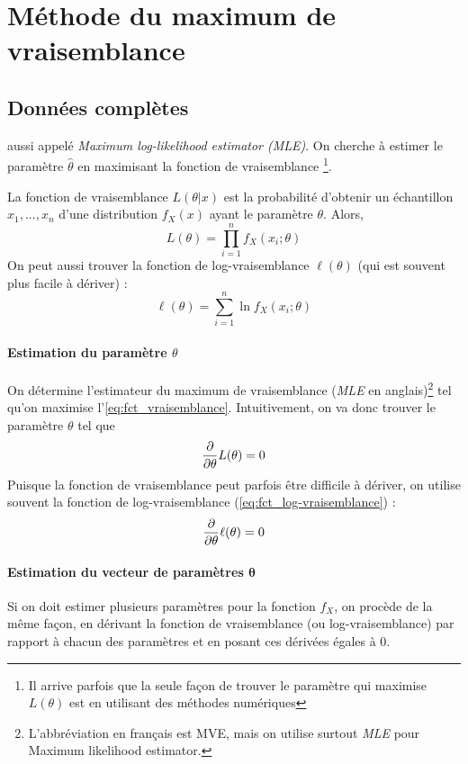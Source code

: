 \documentclass[12pt, french]{report}
\begin{document}
\section{Méthode du maximum de vraisemblance}
\subsection{Données complètes}
aussi appelé \emph{Maximum log-likelihood estimator (MLE)}. On cherche à estimer le paramètre $\hat{\theta}$ en maximisant la fonction de vraisemblance \footnote{Il arrive parfois que la seule façon de trouver le paramètre qui maximise $L(\theta)$ est en utilisant des méthodes numériques}.

\begin{definition}
La fonction de vraisemblance $L(\theta  | x)$ est la probabilité d'obtenir un échantillon $x_1, ..., x_n$ d'une distribution $f_X(x)$ ayant le paramètre $\theta$. Alors,
\begin{equation}
\label{eq:fct_vraisemblance}
L(\theta)	= \prod_{i=1}^{n} f_X(x_i ; \theta)
\end{equation}
On peut aussi trouver la fonction de log-vraisemblance $\ell(\theta)$ (qui est souvent plus facile à dériver) : 
\begin{equation}
\label{eq:fct_log-vraisemblance}
\ell(\theta) = \sum_{i=1}^{n} \ln f_X(x_i ; \theta)
\end{equation}
\end{definition}
\paragraph{Estimation du paramètre $\theta$} On détermine l'estimateur du maximum de vraisemblance (\emph{MLE} en anglais)\footnote{L'abbréviation en français est MVE, mais on utilise surtout \emph{MLE} pour Maximum likelihood estimator.} tel qu'on maximise l'\autoref{eq:fct_vraisemblance}. Intuitivement, on va donc trouver le paramètre $\theta$ tel que
\[\frac{\partial}{\partial \theta} L(\theta) = 0\]
Puisque la fonction de vraisemblance peut parfois être difficile à dériver, on utilise souvent la fonction de log-vraisemblance (\autoref{eq:fct_log-vraisemblance}) : 
\[\frac{\partial}{\partial \theta} \ell(\theta) = 0\]
\paragraph{Estimation du vecteur de paramètres $\boldsymbol{\theta}$}
Si on doit estimer plusieurs paramètres pour la fonction $f_X$, on procède de la même façon, en dérivant la fonction de vraisemblance (ou log-vraisemblance) par rapport à chacun des paramètres et en posant ces dérivées égales à 0.
\end{document}

